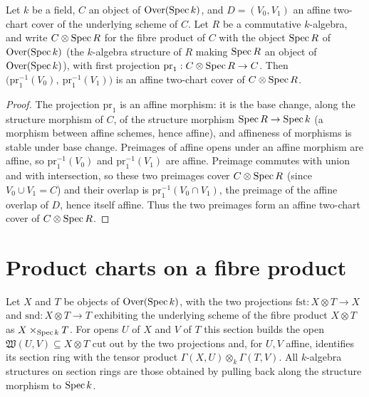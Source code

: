 \begin{theorem}
  \label{pa-thm:AffineTwoCover_pullbackProd}
  \leanok

  Let \(k\) be a field, \(C\) an object of \(\mathrm{Over}(\operatorname{Spec} k)\), and \(D = (V_0,V_1)\) an affine
  two-chart cover of the underlying scheme of \(C\). Let \(R\) be a commutative \(k\)-algebra,
  and write \(C \otimes \operatorname{Spec} R\) for the fibre product of \(C\) with the object \(\operatorname{Spec} R\) of
  \(\mathrm{Over}(\operatorname{Spec} k)\) (the \(k\)-algebra structure of \(R\) making \(\operatorname{Spec} R\) an object of
  \(\mathrm{Over}(\operatorname{Spec} k)\)), with first projection \(\mathrm{pr}_1 : C \otimes \operatorname{Spec} R \to C\). Then
  \(\bigl(\mathrm{pr}_1^{-1}(V_0),\ \mathrm{pr}_1^{-1}(V_1)\bigr)\) is an affine two-chart cover
  of \(C \otimes \operatorname{Spec} R\).
\end{theorem}
\begin{proof}
  \leanok
  The projection \(\mathrm{pr}_1\) is an affine morphism: it is the base change, along the
  structure morphism of \(C\), of the structure morphism \(\operatorname{Spec} R \to \operatorname{Spec} k\) (a morphism
  between affine schemes, hence affine), and affineness of morphisms is stable under base
  change. Preimages of affine opens under an affine morphism are affine, so
  \(\mathrm{pr}_1^{-1}(V_0)\) and \(\mathrm{pr}_1^{-1}(V_1)\) are affine. Preimage commutes with
  union and with intersection, so these two preimages cover \(C \otimes \operatorname{Spec} R\) (since
  \(V_0 \cup V_1 = C\)) and their overlap is \(\mathrm{pr}_1^{-1}(V_0 \cap V_1)\), the preimage
  of the affine overlap of \(D\), hence itself affine. Thus the two preimages form an affine
  two-chart cover of \(C \otimes \operatorname{Spec} R\).
\end{proof}

\section{Product charts on a fibre product}

Let \(X\) and \(T\) be objects of \(\mathrm{Over}(\operatorname{Spec} k)\), with the two projections
\(\mathrm{fst} \colon X \otimes T \to X\) and \(\mathrm{snd} \colon X \otimes T \to T\)
exhibiting the underlying scheme of the fibre product \(X \otimes T\) as
\(X \times_{\operatorname{Spec} k} T\). For opens \(U\) of \(X\) and \(V\) of \(T\) this section builds the
open \(\mathfrak W(U,V) \subseteq X \otimes T\) cut out by the two projections and, for \(U, V\)
affine, identifies its section ring with the tensor product \(\Gamma(X,U) \otimes_k \Gamma(T,V)\).
All \(k\)-algebra structures on section rings are those obtained by pulling back along the
structure morphism to \(\operatorname{Spec} k\).

